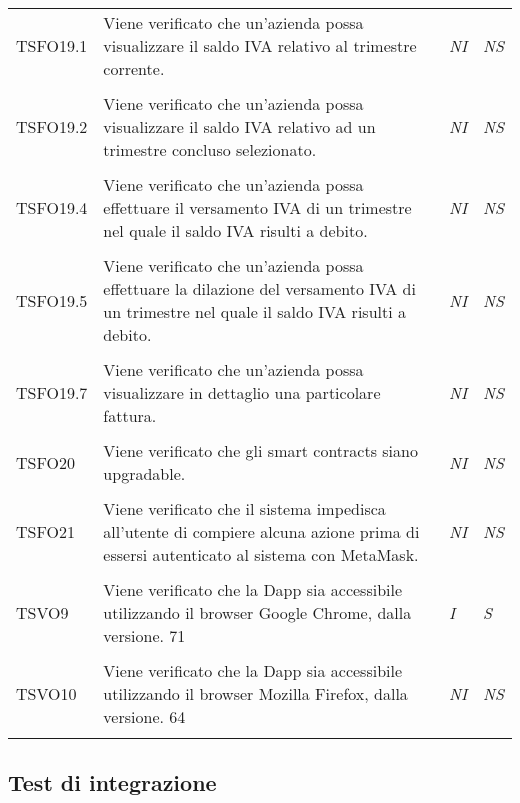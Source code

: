 \begin{longtable}{ >{\centering}p{} >{}p{}
			>{\centering}p{} >{\centering}p{}}
		\tabularnewline
		\hypertarget{TSFO19.1}{TSFO19.1} & Viene verificato che un'azienda possa 
		visualizzare il saldo IVA relativo al trimestre corrente. & 
		\textit{NI} & \textit{NS}\\ 

		\tabularnewline
		\hypertarget{TSFO19.2}{TSFO19.2} & Viene verificato che un'azienda possa 
		visualizzare il saldo IVA relativo ad un trimestre concluso selezionato. & 
		\textit{NI} & \textit{NS}\\ 

		\tabularnewline
		\hypertarget{TSFO19.4}{TSFO19.4} & Viene verificato che un'azienda possa 
		effettuare il versamento IVA di un trimestre nel quale il saldo IVA risulti a 
		debito. & \textit{NI} & \textit{NS}\\ 

		\tabularnewline
		\hypertarget{TSFO19.5}{TSFO19.5} & Viene verificato che un'azienda possa 
		effettuare la dilazione del versamento IVA di un trimestre nel quale il saldo 
		IVA risulti a debito. & \textit{NI} & \textit{NS}\\ 

		\tabularnewline
		\hypertarget{TSFO19.7}{TSFO19.7} & Viene verificato che un'azienda possa 
		visualizzare in dettaglio una particolare fattura. & \textit{NI} & \textit{NS}\\ 

		\tabularnewline
		\hypertarget{TSFO20}{TSFO20} & Viene verificato che gli smart contracts siano 
		upgradable. & \textit{NI} & \textit{NS}\\ 

		\tabularnewline
		\hypertarget{TSFO21}{TSFO21} & Viene verificato che il sistema impedisca 
		all'utente di compiere alcuna azione prima di essersi autenticato al sistema con 
		MetaMask. & \textit{NI} & \textit{NS}\\ 

		\tabularnewline
		\hypertarget{TSVO9}{TSVO9} & Viene verificato che la Dapp sia accessibile 
		utilizzando il browser Google Chrome, dalla versione. 71 & 
		\textit{I} & \textit{S}\\

		\tabularnewline
		\hypertarget{TSVO10}{TSVO10} & Viene verificato che la Dapp sia accessibile 
		utilizzando il browser Mozilla Firefox, dalla versione. 64 & \textit{NI} & \textit{NS}\\  
		\tabularnewline
		\end{longtable}


\subsection{Test di integrazione}
	\renewcommand{\arraystretch}{1.5}
		
